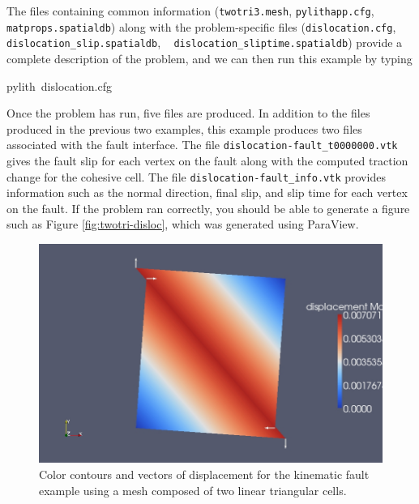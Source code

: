 The files containing common information (\texttt{twotri3.mesh}, \texttt{pylithapp.cfg},
\texttt{matprops.spatialdb}) along with the problem-specific files
(\texttt{\small{}dislocation.cfg}{\small{}, }\texttt{\small{}dislocation\_slip.spatialdb}{\small{},
}\texttt{\small{}}~\linebreak{}
\texttt{\small{}dislocation\_sliptime.spatialdb}) provide a complete
description of the problem, and we can then run this example by typing
\begin{lyxcode}
pylith~dislocation.cfg
\end{lyxcode}
Once the problem has run, five files are produced. In addition to
the files produced in the previous two examples, this example produces
two files associated with the fault interface. The file \texttt{dislocation-fault\_t0000000.vtk}
gives the fault slip for each vertex on the fault along with the computed
traction change for the cohesive cell. The file \texttt{dislocation-fault\_info.vtk}
provides information such as the normal direction, final slip, and
slip time for each vertex on the fault. If the problem ran correctly,
you should be able to generate a figure such as Figure \vref{fig:twotri-disloc},
which was generated using ParaView.

\noindent \begin{center}
\begin{figure}
\begin{centering}
\includegraphics[scale=0.33]{tutorials/twocells/figs/twotri3-dislocation}
\par\end{centering}

\caption{Color contours and vectors of displacement for the kinematic fault
example using a mesh composed of two linear triangular cells.\label{fig:twotri-disloc}}
\end{figure}

\par\end{center}
